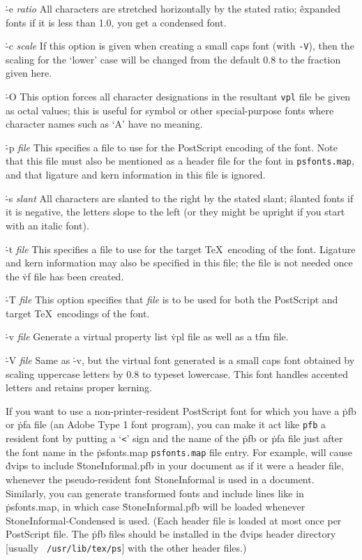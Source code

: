 {\options
\.{-e {\it ratio}}
All characters are stretched horizontally by the stated ratio;
\^{expanded fonts}
if it is less than 1.0, you get a condensed font.

\.{-c {\it scale}}
If this option is given when creating a small caps font
(with {\tt -V}), then the scaling for the `lower'
case will be changed from the default 0.8 to the fraction
given here.

\.{-O}
This option forces all character designations in the resultant
{\tt vpl} file be given as octal values; this is useful for
symbol or other special-purpose fonts where character names such
as `A' have no meaning.

\.{-p {\it file}}
This specifies a file to use for the PostScript encoding of the
font.  Note that this file must also be mentioned as a header
file for the font in {\tt psfonts.map}, and that ligature
and kern information in this file is ignored.

\.{-s {\it slant}}
All characters are slanted to the right by the stated slant;
\^{slanted fonts}
if it is negative, the letters slope to the left (or they might be
upright if you start with an italic font).

\.{-t {\it file}}
This specifies a file to use for the target \TeX\ encoding of the
font.  Ligature and kern information may also be specified in this
file; the file is not needed once the \.{vf} file has been created.

\.{-T {\it file}}
This option specifies that {\it file} is to be used for both
the PostScript and target \TeX\ encodings of the font.

\.{-v {\it file}}
Generate a virtual property list \.{vpl} file as well as a \.{tfm} file.

\.{-V {\it file}}
Same as \.{-v}, but the virtual font generated is a small caps font obtained
by scaling uppercase letters by 0.8 to typeset lowercase. This font
handles accented letters and retains proper kerning.\par}


If you want to use a non-printer-resident PostScript font for which you have
a \.{pfb} or \.{pfa} file (an Adobe Type 1 font program),
you can make it act like
\^{{\tt pfb}}
a resident font by putting a `{\tt <}' sign
and the name of the \.{pfb} or \.{pfa} file just after the font name in the
\.{psfonts.map}
\^{{\tt psfonts.map}}
file entry. For example,
\noindent
will cause \.{dvips} to include \.{StoneInformal.pfb} in your document as if
it were a header file, whenever the pseudo-resident font StoneInformal is
used in a document.   Similarly, you can generate transformed fonts and
include lines like
\noindent
in \.{psfonts.map}, in which case \.{StoneInformal.pfb} will be loaded
whenever StoneInformal-Condensed is used. (Each header file is loaded
at most once per PostScript file. The \.{pfb} files should be
installed in the \.{dvips} header directory [usually {\tt
/usr/lib/tex/ps}] with the other header files.)

